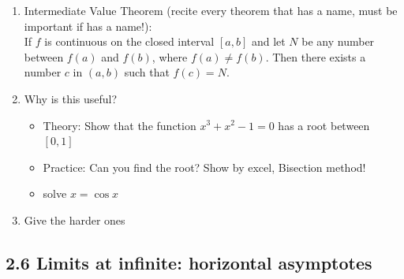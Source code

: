 \documentclass{article}
\begin{document}
\begin{enumerate}
\item Intermediate Value Theorem (recite every theorem that has a name, must be important if has a name!): \\
If $f$ is continuous on the closed interval $[a,b]$ and let $N$ be any number between $f(a)$ and $f(b)$, where $f(a) \neq f(b)$. Then there exists a number $c$ in $(a,b)$ such that $f(c)=N$.
\item Why is this useful? 
\begin{itemize}
\item Theory: Show that the function $x^3+x^2-1 = 0$ has a root between $[0,1]$ 
\item Practice: Can you find the root? Show by excel, Bisection method!
\item solve $x = \cos x$
\end{itemize}
\item Give the harder ones
\end{enumerate}


\subsection{2.6 Limits at infinite: horizontal asymptotes}
\end{document}
